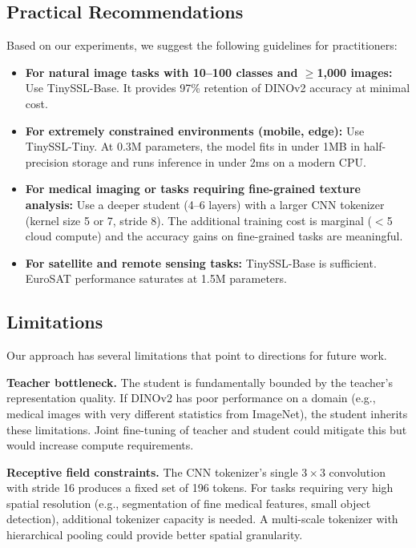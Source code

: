 \documentclass{article}
\newcommand{\method}{TinySSL}
\begin{document}
\subsection{Practical Recommendations}

Based on our experiments, we suggest the following guidelines for practitioners:

\begin{itemize}
    \item \textbf{For natural image tasks with 10--100 classes and $\ge$1,000 images:} Use \method-Base. It provides 97\% retention of DINOv2 accuracy at minimal cost.
    \item \textbf{For extremely constrained environments (mobile, edge):} Use \method-Tiny. At 0.3M parameters, the model fits in under 1MB in half-precision storage and runs inference in under 2ms on a modern CPU.
    \item \textbf{For medical imaging or tasks requiring fine-grained texture analysis:} Use a deeper student (4--6 layers) with a larger CNN tokenizer (kernel size 5 or 7, stride 8). The additional training cost is marginal ($<$5 cloud compute) and the accuracy gains on fine-grained tasks are meaningful.
    \item \textbf{For satellite and remote sensing tasks:} \method-Base is sufficient. EuroSAT performance saturates at 1.5M parameters.
\end{itemize}

\subsection{Limitations}

Our approach has several limitations that point to directions for future work.

\textbf{Teacher bottleneck.} The student is fundamentally bounded by the teacher's representation quality. If DINOv2 has poor performance on a domain (e.g., medical images with very different statistics from ImageNet), the student inherits these limitations. Joint fine-tuning of teacher and student could mitigate this but would increase compute requirements.

\textbf{Receptive field constraints.} The CNN tokenizer's single $3\times3$ convolution with stride 16 produces a fixed set of 196 tokens. For tasks requiring very high spatial resolution (e.g., segmentation of fine medical features, small object detection), additional tokenizer capacity is needed. A multi-scale tokenizer with hierarchical pooling could provide better spatial granularity.
\end{document}
